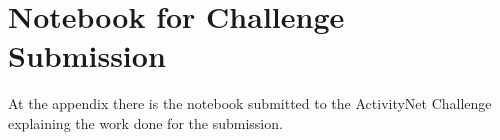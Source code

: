 \chapter{Notebook for Challenge Submission}

At the appendix there is the notebook submitted to the ActivityNet Challenge explaining the work
done for the submission.
